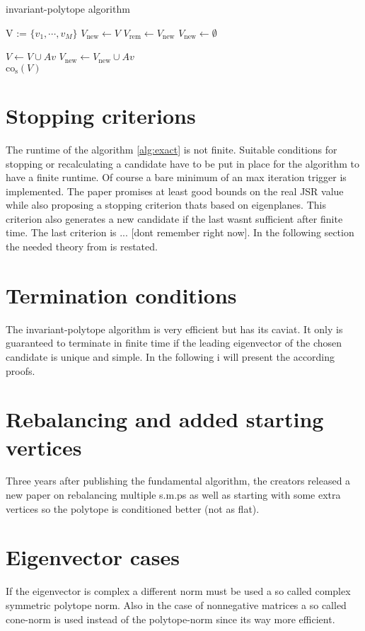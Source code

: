 \FloatBarrier

\begin{algorithm}
\caption{invariant-polytope algorithm}
\label{alg:exact}
\begin{algorithmic}

\State V := $\{v_1, \cdots, v_M\}$
\State $V_{\text{new}} \gets V$
\State $V_{\text{rem}} \gets V_{\text{new}}$
\State $V_{\text{new}} \gets \emptyset$

\State $V \gets V \cup Av$
\State $V_{\text{new}} \gets V_{\text{new}} \cup Av$
\EndIf
\EndFor
\EndFor
\EndWhile \\
\Return $\text{co}_{\text{s}}(V)$ \\
\end{algorithmic} 
\end{algorithm}

\FloatBarrier

\vspace{2cm}

\section{Stopping criterions}
The runtime of the algorithm \ref{alg:exact} is not finite. 
Suitable conditions for stopping or recalculating a candidate have to be put in place for the algorithm to have a finite runtime. 
Of course a bare minimum of an max iteration trigger is implemented. 
The paper \citep{guglielmiExactComputationJoint2011} promises at least good bounds on the real JSR value while also proposing a stopping criterion thats based on eigenplanes. This criterion also generates a new candidate if the last wasnt sufficient after finite time.
The last criterion is ... [dont remember right now].
In the following section the needed theory from \citep{guglielmiExactComputationJoint2011} is restated. 

\section{Termination conditions}
The invariant-polytope algorithm is very efficient but has its caviat. It only is guaranteed to terminate in finite time if the leading eigenvector of the chosen candidate is unique and simple. 
In the following i will present the according proofs. 

\section{Rebalancing and added starting vertices}
Three years after publishing the fundamental algorithm, the creators released a new paper on rebalancing multiple s.m.ps as well as starting with some extra vertices so the polytope is conditioned better (not as flat).

\section{Eigenvector cases}
If the eigenvector is complex a different norm must be used a so called complex symmetric polytope norm. 
Also in the case of nonnegative matrices a so called cone-norm is used instead of the polytope-norm since its way more efficient. 


